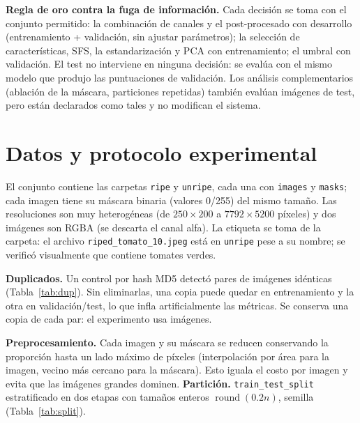 \documentclass[11pt,a4paper]{article}
\newcommand{\tabin}[1]{\adjustbox{max width=\linewidth}{}}
\begin{document}
\textbf{Regla de oro contra la fuga de información.} Cada decisión se toma con el conjunto
permitido: la combinación de canales y el post-procesado con desarrollo (entrenamiento +
validación, sin ajustar parámetros); la selección de características, SFS, la
estandarización y PCA con entrenamiento; el umbral con validación. El test no interviene en
ninguna decisión: se evalúa con el mismo modelo que produjo las puntuaciones de validación. Los
análisis complementarios (ablación de la máscara, particiones repetidas) también evalúan
imágenes de test, pero están declarados como tales y no modifican el sistema.

\section{Datos y protocolo experimental}

El conjunto contiene las carpetas \texttt{ripe} y \texttt{unripe}, cada una con
\texttt{images} y \texttt{masks}; cada imagen tiene su máscara binaria (valores 0/255) del
mismo tamaño. Las resoluciones son muy heterogéneas (de $250\times200$ a
$7792\times5200$ píxeles) y dos imágenes son RGBA (se descarta el canal alfa). La etiqueta
se toma de la carpeta: el archivo \texttt{riped\_tomato\_10.jpeg} está en \texttt{unripe}
pese a su nombre; se verificó visualmente que contiene tomates verdes.

\textbf{Duplicados.} Un control por hash MD5 detectó \NDuplicates{} pares de imágenes
idénticas (Tabla~\ref{tab:dup}). Sin eliminarlas, una copia puede quedar en entrenamiento y
la otra en validación/test, lo que infla artificialmente las métricas. Se conserva una copia
de cada par: el experimento usa \NImages{} imágenes.

\begin{table}[H]
\centering
\begin{minipage}{0.47\textwidth}\centering
\caption{Duplicados eliminados.}\label{tab:dup}
\tabin{results/tex/duplicates.tex}
\end{minipage}\hfill
\begin{minipage}{0.5\textwidth}\centering
\caption{Partición estratificada por imagen.}\label{tab:split}
\tabin{results/tex/split.tex}
\end{minipage}
\end{table}

\textbf{Preprocesamiento.} Cada imagen y su máscara se reducen conservando la proporción
hasta un lado máximo de \MaxSide{} píxeles (interpolación por área para la imagen, vecino más
cercano para la máscara). Esto iguala el costo por imagen y evita que las imágenes grandes
dominen. \textbf{Partición.} \texttt{train\_test\_split} estratificado en dos etapas con
tamaños enteros $\operatorname{round}(0.2n)$, semilla \Seed{} (Tabla~\ref{tab:split}).
\end{document}
